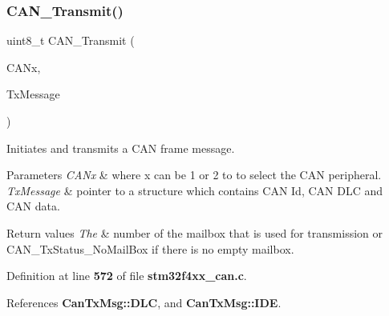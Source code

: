 \subsubsection{C\+A\+N\+\_\+\+Transmit()}
{\footnotesize\ttfamily uint8\+\_\+t C\+A\+N\+\_\+\+Transmit (\begin{DoxyParamCaption}\item[{\textbf{ C\+A\+N\+\_\+\+Type\+Def} $\ast$}]{C\+A\+Nx,  }\item[{\textbf{ Can\+Tx\+Msg} $\ast$}]{Tx\+Message }\end{DoxyParamCaption})}



Initiates and transmits a C\+AN frame message. 


\begin{DoxyParams}{Parameters}
{\em C\+A\+Nx} & where x can be 1 or 2 to to select the C\+AN peripheral. \\
\hline
{\em Tx\+Message} & pointer to a structure which contains C\+AN Id, C\+AN D\+LC and C\+AN data. \\
\hline
\end{DoxyParams}

\begin{DoxyRetVals}{Return values}
{\em The} & number of the mailbox that is used for transmission or C\+A\+N\+\_\+\+Tx\+Status\+\_\+\+No\+Mail\+Box if there is no empty mailbox. \\
\hline
\end{DoxyRetVals}


Definition at line \textbf{ 572} of file \textbf{ stm32f4xx\+\_\+can.\+c}.



References \textbf{ Can\+Tx\+Msg\+::\+D\+LC}, and \textbf{ Can\+Tx\+Msg\+::\+I\+DE}.


